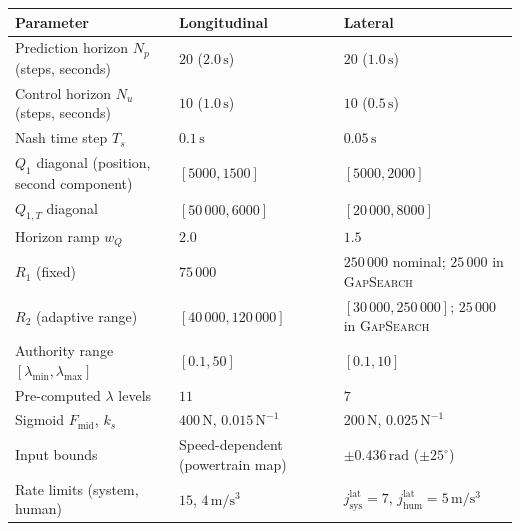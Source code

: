 \documentclass[12pt,a4paper,oneside]{report}
\begin{document}
\begin{table}[H]
\centering
\footnotesize
\setlength{\tabcolsep}{4pt}
\renewcommand{\arraystretch}{1.2}
\begin{tabularx}{\textwidth}{|l|X|X|}
\hline
\textbf{Parameter} & \textbf{Longitudinal} & \textbf{Lateral} \\
\hline
Prediction horizon $N_p$ (steps, seconds) & $20$ ($2.0\,\mathrm{s}$)                        & $20$ ($1.0\,\mathrm{s}$)               \\
Control horizon $N_u$ (steps, seconds)    & $10$ ($1.0\,\mathrm{s}$)                        & $10$ ($0.5\,\mathrm{s}$)               \\
Nash time step $T_s$                      & $0.1\,\mathrm{s}$                               & $0.05\,\mathrm{s}$                     \\
\hline
$Q_1$ diagonal (position, second component) & $[5000, 1500]$                                & $[5000, 2000]$                         \\
$Q_{1,T}$ diagonal                        & $[50\,000, 6000]$                               & $[20\,000, 8000]$                      \\
Horizon ramp $w_Q$                        & $2.0$                                           & $1.5$                                  \\
$R_1$ (fixed)                             & $75\,000$                                       & $250\,000$ nominal; $25\,000$ in \textsc{GapSearch} \\
$R_2$ (adaptive range)                    & $[40\,000, 120\,000]$                           & $[30\,000, 250\,000]$; $25\,000$ in \textsc{GapSearch} \\
\hline
Authority range $[\lambda_{\min}, \lambda_{\max}]$ & $[0.1, 50]$                             & $[0.1, 10]$                            \\
Pre-computed $\lambda$ levels             & $11$                                            & $7$                                    \\
Sigmoid $F_{\text{mid}}$, $k_s$           & $400\,\mathrm{N}$, $0.015\,\mathrm{N}^{-1}$     & $200\,\mathrm{N}$, $0.025\,\mathrm{N}^{-1}$ \\
\hline
Input bounds                              & Speed-dependent (powertrain map)                & $\pm 0.436\,\mathrm{rad}$ ($\pm 25^\circ$) \\
Rate limits (system, human)               & $15$, $4\,\mathrm{m/s^3}$                       & $j^{\text{lat}}_{\text{sys}} = 7$, $j^{\text{lat}}_{\text{hum}} = 5\,\mathrm{m/s^3}$ \\

\end{tabularx}
\end{table}
\end{document}

